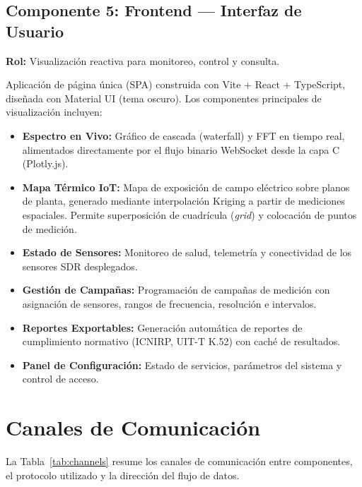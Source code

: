 \documentclass[12pt,a4paper]{article}
\begin{document}
\subsection{Componente 5: Frontend --- Interfaz de Usuario}

\textbf{Rol:} Visualización reactiva para monitoreo, control y consulta.

Aplicación de página única (SPA) construida con Vite + React + TypeScript, diseñada con Material UI (tema oscuro). Los componentes principales de visualización incluyen:

\begin{itemize}
  \item \textbf{Espectro en Vivo:} Gráfico de cascada (waterfall) y FFT en tiempo real, alimentados directamente por el flujo binario WebSocket desde la capa C (Plotly.js).
  \item \textbf{Mapa Térmico IoT:} Mapa de exposición de campo eléctrico sobre planos de planta, generado mediante interpolación Kriging a partir de mediciones espaciales. Permite superposición de cuadrícula (\textit{grid}) y colocación de puntos de medición.
  \item \textbf{Estado de Sensores:} Monitoreo de salud, telemetría y conectividad de los sensores SDR desplegados.
  \item \textbf{Gestión de Campañas:} Programación de campañas de medición con asignación de sensores, rangos de frecuencia, resolución e intervalos.
  \item \textbf{Reportes Exportables:} Generación automática de reportes de cumplimiento normativo (ICNIRP, UIT-T K.52) con caché de resultados.
  \item \textbf{Panel de Configuración:} Estado de servicios, parámetros del sistema y control de acceso.
\end{itemize}

\section{Canales de Comunicación}

La Tabla~\ref{tab:channels} resume los canales de comunicación entre componentes, el protocolo utilizado y la dirección del flujo de datos.
\end{document}
